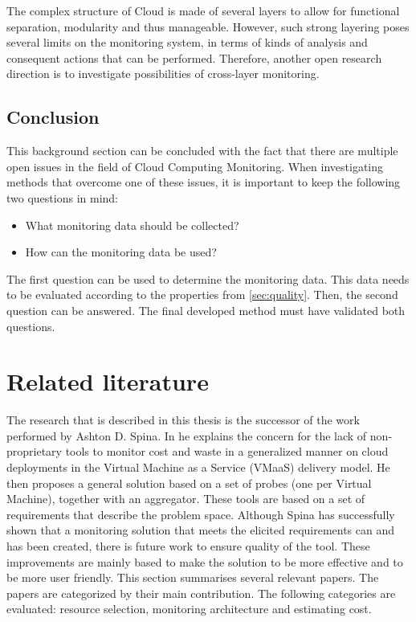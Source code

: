 \noindent
The complex structure of Cloud is made of several layers to allow for functional separation, modularity and thus manageable. However, such strong layering poses several limits on the monitoring system, in terms of kinds of analysis and consequent actions that can be performed. Therefore, another open research direction is to investigate possibilities of cross-layer monitoring.

\subsection{Conclusion}
This background section can be concluded with the fact that there are multiple open issues in the field of Cloud Computing Monitoring. When investigating methods that overcome one of these issues, it is important to keep the following two questions in mind:
\begin{itemize}
    \item What monitoring data should be collected?
    \item How can the monitoring data be used?
\end{itemize} 
The first question can be used to determine the monitoring data. This data needs to be evaluated according to the properties from \autoref{sec:quality}. Then, the second question can be answered. The final developed method must have validated both questions.


\section{Related literature} \label{sec:related_literature}
The research that is described in this thesis is the successor of the work performed by Ashton D. Spina. In \cite{spina} he explains the concern for the lack of non-proprietary tools to monitor cost and waste in a generalized manner on cloud deployments in the Virtual Machine as a Service (VMaaS) delivery model. He then proposes a general solution based on a set of probes (one per Virtual Machine), together with an aggregator. These tools are based on a set of requirements that describe the problem space. Although Spina has successfully shown that a monitoring solution that meets the elicited requirements can and has been created, there is future work to ensure quality of the tool. These improvements are mainly based to make the solution to be more effective and to be more user friendly. This section summarises several relevant papers. The papers are categorized by their main contribution. The following categories are evaluated: resource selection, monitoring architecture and estimating cost.

